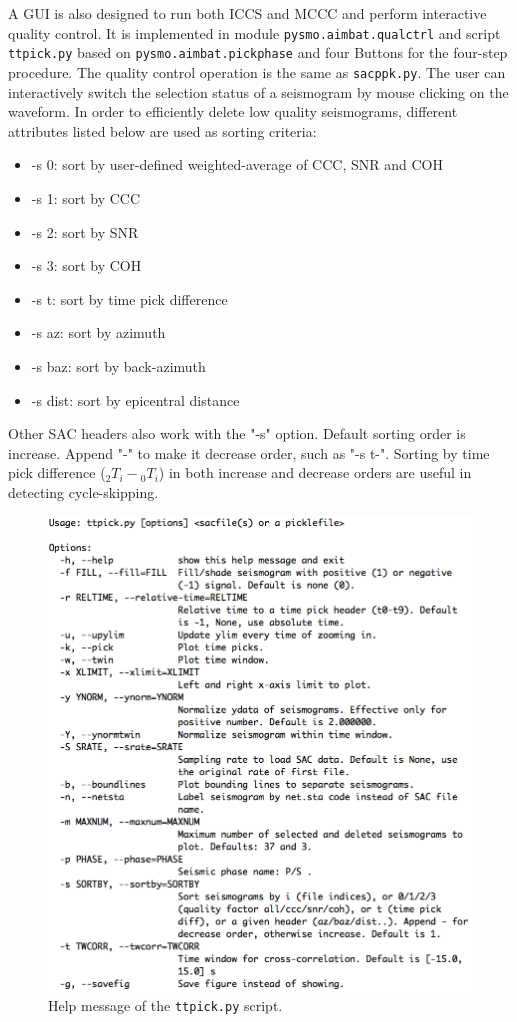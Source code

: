 \documentclass[12pt, titlepage]{article}
\begin{document}
A GUI is also designed to run both ICCS and MCCC and perform interactive quality control. It is implemented in module \texttt{pysmo.aimbat.qualctrl} and script \texttt{ttpick.py} based on \texttt{pysmo.aimbat.pickphase} and four Buttons for the four-step procedure.
The quality control operation is the same as \texttt{sacppk.py}. The user can interactively switch the selection status of a seismogram by mouse clicking on the waveform. 
In order to efficiently delete low quality seismograms, different attributes listed below are used as sorting criteria:
\begin{itemize}
  \item -s 0: sort by user-defined weighted-average of CCC, SNR and COH
  \item -s 1: sort by CCC
  \item -s 2: sort by SNR
  \item -s 3: sort by COH
  \item -s t: sort by time pick difference
  \item -s az: sort by azimuth
  \item -s baz: sort by back-azimuth
  \item -s dist: sort by epicentral distance
\end{itemize}
Other SAC headers also work with the "-s" option.
Default sorting order is increase. Append "-" to make it decrease order, such as "-s t-".
Sorting by time pick difference (${_2}T_i-{_0}T_i$) in both increase and decrease orders are useful in detecting cycle-skipping.



\begin{figure}[!hb]
    \centering
    \includegraphics[width = 0.94 \textwidth]{figs/help-ttpick.png}
    \caption{Help message of the \texttt{ttpick.py} script. }
    \label{fig:help-ttpick}
\end{figure}
\end{document}
